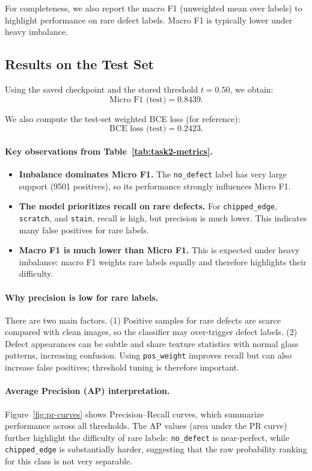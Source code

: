 For completeness, we also report the macro F1 (unweighted mean over labels) to highlight performance on rare defect labels. Macro F1 is typically lower under heavy imbalance.

\subsection{Results on the Test Set}
Using the saved checkpoint and the stored threshold $t=0.50$, we obtain:
\[
\text{Micro F1 (test)} = 0.8439.
\]

We also compute the test-set weighted BCE loss (for reference):
\[
\text{BCE loss (test)} = 0.2423.
\]



\paragraph{Key observations from Table~\ref{tab:task2-metrics}.}
\begin{itemize}
  \item \textbf{Imbalance dominates Micro F1.} The \texttt{no\_defect} label has very large support (9501 positives), so its performance strongly influences Micro F1.
  \item \textbf{The model prioritizes recall on rare defects.} For \texttt{chipped\_edge}, \texttt{scratch}, and \texttt{stain}, recall is high, but precision is much lower. This indicates many false positives for rare labels.
  \item \textbf{Macro F1 is much lower than Micro F1.} This is expected under heavy imbalance: macro F1 weights rare labels equally and therefore highlights their difficulty.
\end{itemize}

\paragraph{Why precision is low for rare labels.} There are two main factors. (1) Positive samples for rare defects are scarce compared with clean images, so the classifier may over-trigger defect labels. (2) Defect appearances can be subtle and share texture statistics with normal glass patterns, increasing confusion. Using \texttt{pos\_weight} improves recall but can also increase false positives; threshold tuning is therefore important.

\paragraph{Average Precision (AP) interpretation.} Figure~\ref{fig:pr-curves} shows Precision--Recall curves, which summarize performance across all thresholds. The AP values (area under the PR curve) further highlight the difficulty of rare labels: \texttt{no\_defect} is near-perfect, while \texttt{chipped\_edge} is substantially harder, suggesting that the raw probability ranking for this class is not very separable.

